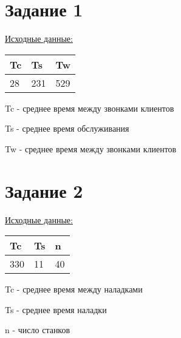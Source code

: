 



\section*{Задание 1}

\underline{Исходные данные:}
\begin{table}[h!]
    \begin{tabular} {|l|l|l|}
        \hline
        \textbf{Tc} & \textbf{Ts} & \textbf{Tw} \\ \hline
        28 & 231 &  529 \\ \hline
    \end{tabular}
\end{table}

Tc - среднее время между звонками клиентов

Ts - среднее время обслуживания

Tw - среднее время между звонками клиентов






\section*{Задание 2}

\underline{Исходные данные:}
\begin{table}[h!]
    \begin{tabular} {|l|l|l|}
        \hline
        \textbf{Tc} & \textbf{Ts} & \textbf{n} \\ \hline
        330 & 11 &  40 \\ \hline
    \end{tabular}
\end{table}

Tc - среднее время между наладками

Ts - среднее время наладки

n - число станков






